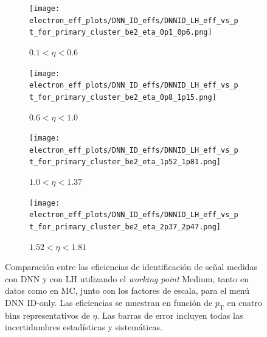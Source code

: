 \begin{figure}[h]
  \centering

  \begin{subfigure}[b]{0.48\textwidth}
    \centering
    \texttt{[image: electron\_eff\_plots/DNN\_ID\_effs/DNNID\_LH\_eff\_vs\_pt\_for\_primary\_cluster\_be2\_eta\_0p1\_0p6.png]}
    \caption{$0.1 < \eta < 0.6$}
    \label{fig:eff_dnn_lh_etabin1}
  \end{subfigure}
  \hfill
  \begin{subfigure}[b]{0.48\textwidth}
    \centering
    \texttt{[image: electron\_eff\_plots/DNN\_ID\_effs/DNNID\_LH\_eff\_vs\_pt\_for\_primary\_cluster\_be2\_eta\_0p8\_1p15.png]}
    \caption{$0.6 < \eta < 1.0$}
    \label{fig:eff_dnn_lh_etabin2}
  \end{subfigure}

  \vspace{0.5cm}

  \begin{subfigure}[b]{0.48\textwidth}
    \centering
    \texttt{[image: electron\_eff\_plots/DNN\_ID\_effs/DNNID\_LH\_eff\_vs\_pt\_for\_primary\_cluster\_be2\_eta\_1p52\_1p81.png]}
    \caption{$1.0 < \eta < 1.37$}
    \label{fig:eff_dnn_lh_etabin3}
  \end{subfigure}
  \hfill
  \begin{subfigure}[b]{0.48\textwidth}
    \centering
    \texttt{[image: electron\_eff\_plots/DNN\_ID\_effs/DNNID\_LH\_eff\_vs\_pt\_for\_primary\_cluster\_be2\_eta\_2p37\_2p47.png]}
    \caption{$1.52 < \eta < 1.81$}
    \label{fig:eff_dnn_lh_etabin4}
  \end{subfigure}

  \caption{
    Comparación entre las eficiencias de identificación de señal medidas con DNN y con LH utilizando el \textit{working point} Medium, 
    tanto en datos como en MC, junto con los factores de escala, para el menú DNN ID-only. 
    Las eficiencias se muestran en función de $p_{\mathrm{T}}$ en cuatro bins representativos de $\eta$. 
    Las barras de error incluyen todas las incertidumbres estadísticas y sistemáticas.}
  \label{fig:eff_sfs_dnn_vs_lh_pt_4etabins}
\end{figure}

